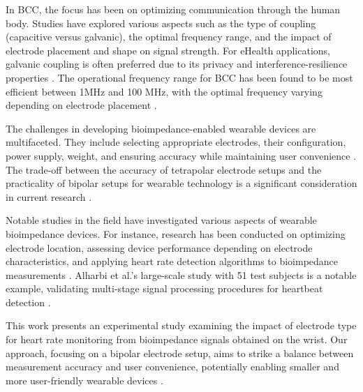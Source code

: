 {In BCC, the focus has been on optimizing communication through the human body. Studies have explored various aspects such as the type of coupling (capacitive versus galvanic), the optimal frequency range, and the impact of electrode placement and shape on signal strength. For eHealth applications, galvanic coupling is often preferred due to its privacy and interference-resilience properties \cite{lapsa2022electrode, shi2024spatially}. The operational frequency range for BCC has been found to be most efficient between 1MHz and 100 MHz, with the optimal frequency varying depending on electrode placement \cite{lapsa2022electrode, }.

The challenges in developing bioimpedance-enabled wearable devices are multifaceted. They include selecting appropriate electrodes, their configuration, power supply, weight, and ensuring accuracy while maintaining user convenience \cite{rabbani2023low, ormanis2020towards}. The trade-off between the accuracy of tetrapolar electrode setups and the practicality of bipolar setups for wearable technology is a significant consideration in current research \cite{ormanis2020towards, rabbani2023low}.

Notable studies in the field have investigated various aspects of wearable bioimpedance devices. For instance, research has been conducted on optimizing electrode location, assessing device performance depending on electrode characteristics, and applying heart rate detection algorithms to bioimpedance measurements \cite{ormanis2020towards, lee2021recent, zhang2023physiological}. Alharbi et al.'s large-scale study with 51 test subjects is a notable example, validating multi-stage signal processing procedures for heartbeat detection \cite{ormanis2020towards, bellier2023wireless}.

This work presents an experimental study examining the impact of electrode type for heart rate monitoring from bioimpedance signals obtained on the wrist. Our approach, focusing on a bipolar electrode setup, aims to strike a balance between measurement accuracy and user convenience, potentially enabling smaller and more user-friendly wearable devices \cite{ormanis2020towards}.
}


